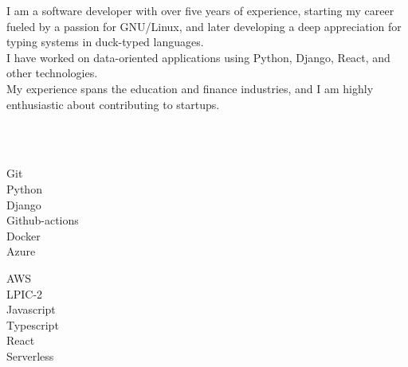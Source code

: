 \documentclass[9pt]{developercv}
\begin{document}
\begin{minipage}[t]{1\textwidth}
	\vspace{-\baselineskip}
	I am a software developer with over five years of experience, starting my career fueled by a passion for GNU/Linux, and later developing a deep appreciation for typing systems in duck-typed languages. \\
	I have worked on data-oriented applications using Python, Django, React, and other technologies. \\
	My experience spans the education and finance industries, and I am highly enthusiastic about contributing to startups.
\end{minipage}


\\\\
\begin{minipage}[t]{0.49\textwidth}
	\Large
	\vspace{-\baselineskip}

	\faCircle \; {Git}\\
	\faCircle \; {Python}\\
	\faCircle \; {Django}\\
	\faCircle \; {Github-actions}\\
	\faCircle \; {Docker}\\
	\faCircle \; {Azure}\\
\end{minipage}
\begin{minipage}[t]{0.50\textwidth}
	\Large
	\vspace{-\baselineskip}

	\faCircle \; {AWS}\\
	\faCircle \; {LPIC-2}\\
	\faCircle \; {Javascript}\\
	\faCircle \; {Typescript}\\
	\faCircle \; {React}\\
	\faCircle \; {Serverless}\\
\end{minipage}
\end{document}
